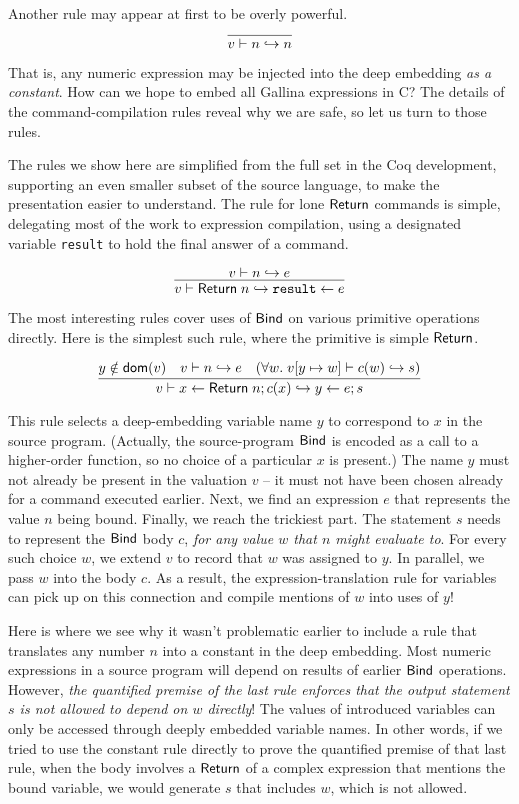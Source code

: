 \documentclass{amsbook}
\theoremstyle{definition}
\theoremstyle{remark}
\numberwithin{section}{chapter}
\numberwithin{equation}{chapter}
\begin{document}
Another rule may appear at first to be overly powerful.
$$\infer{\dscomp{v}{n}{n}}{}$$

That is, any numeric expression may be injected into the deep embedding \emph{as a constant}.
How can we hope to embed all Gallina expressions in C?
The details of the command-compilation rules reveal why we are safe, so let us turn to those rules.

The rules we show here are simplified from the full set in the Coq development, supporting an even smaller subset of the source language, to make the presentation easier to understand.
The rule for lone $\mathsf{Return}$ commands is simple, delegating most of the work to expression compilation, using a designated variable \texttt{result} to hold the final answer of a command.

$$\infer{\dscomp{v}{\mt{Return} \; n}{\assign{\texttt{result}}{e}}}{
  \dscomp{v}{n}{e}
}$$

The most interesting rules cover uses of $\mathsf{Bind}$ on various primitive operations directly.
Here is the simplest such rule, where the primitive is simple $\mathsf{Return}$.

$$\infer{\dscomp{v}{x \leftarrow \mt{Return} \; n; c(x)}{\assign{y}{e}; s}}{
    y \notin \dom{v}
    & \dscomp{v}{n}{e}
    & (\forall w. \; \dscomp{\mupd{v}{y}{w}}{c(w)}{s})
}$$

This rule selects a deep-embedding variable name $y$ to correspond to $x$ in the source program.
(Actually, the source-program $\mathsf{Bind}$ is encoded as a call to a higher-order function, so no choice of a particular $x$ is present.)
The name $y$ must not already be present in the valuation $v$ -- it must not have been chosen already for a command executed earlier.
Next, we find an expression $e$ that represents the value $n$ being bound.
Finally, we reach the trickiest part.
The statement $s$ needs to represent the $\mathsf{Bind}$ body $c$, \emph{for any value $w$ that $n$ might evaluate to}.
For every such choice $w$, we extend $v$ to record that $w$ was assigned to $y$.
In parallel, we pass $w$ into the body $c$.
As a result, the expression-translation rule for variables can pick up on this connection and compile mentions of $w$ into uses of $y$!

Here is where we see why it wasn't problematic earlier to include a rule that translates any number $n$ into a constant in the deep embedding.
Most numeric expressions in a source program will depend on results of earlier $\mathsf{Bind}$ operations.
However, \emph{the quantified premise of the last rule enforces that the output statement $s$ is not allowed to depend on $w$ directly}!
The values of introduced variables can only be accessed through deeply embedded variable names.
In other words, if we tried to use the constant rule directly to prove the quantified premise of that last rule, when the body involves a $\mathsf{Return}$ of a complex expression that mentions the bound variable, we would generate $s$ that includes $w$, which is not allowed.
\end{document}
